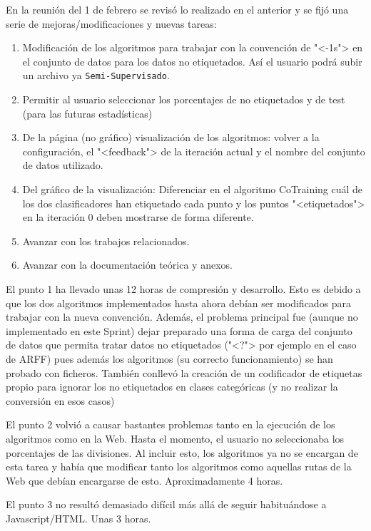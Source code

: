 En la reunión del 1 de febrero se revisó lo realizado en el anterior y se fijó
una serie de mejoras/modificaciones y nuevas tareas:
\begin{enumerate}
    \item Modificación de los algoritmos para trabajar con la convención de
    "<-1s"> en el conjunto de datos para los datos no etiquetados. Así el
    usuario podrá subir un archivo ya \texttt{Semi-Supervisado}.
    \item Permitir al usuario seleccionar los porcentajes de no etiquetados y de
    test (para las futuras estadísticas)
    \item De la página (no gráfico) visualización de los algoritmos: volver a la configuración, el
    "<feedback"> de la iteración actual y el nombre del conjunto de datos utilizado.
    \item Del gráfico de la visualización: Diferenciar en el algoritmo
    CoTraining cuál de los dos clasificadores han etiquetado cada punto y los
    puntos "<etiquetados"> en la iteración 0 deben mostrarse de forma diferente.
    \item Avanzar con los trabajos relacionados.
    \item Avanzar con la documentación teórica y anexos.
\end{enumerate}

El punto 1 ha llevado unas 12 horas de compresión y desarrollo. Esto es debido a
que los dos algoritmos implementados hasta ahora debían ser modificados para
trabajar con la nueva convención. Además, el problema principal fue (aunque no
implementado en este Sprint) dejar preparado una forma de carga del conjunto de
datos que permita tratar datos no etiquetados ("<?"> por ejemplo en el caso de
ARFF) pues además los algoritmos (su correcto funcionamiento) se han probado con
ficheros. También conllevó la creación de un codificador de etiquetas propio
para ignorar los no etiquetados en clases categóricas (y no realizar la
conversión en esos casos)

El punto 2 volvió a causar bastantes problemas tanto en la ejecución de los
algoritmos como en la Web. Hasta el momento, el usuario no seleccionaba los
porcentajes de las divisiones. Al incluir esto, los algoritmos ya no se encargan
de esta tarea y había que modificar tanto los algoritmos como aquellas rutas de
la Web que debían encargarse de esto. Aproximadamente 4 horas.

El punto 3 no resultó demasiado difícil más allá de seguir habituándose a
Javascript/HTML. Unas 3 horas.

